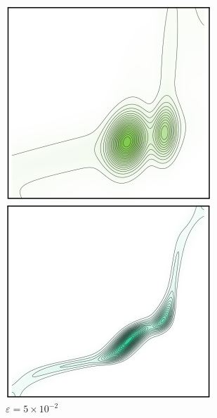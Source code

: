 \documentclass[cn,10pt,math=newtx,citestyle=gb7714-2015,bibstyle=gb7714-2015]{elegantbook}
\begin{document}
\begin{figure}[H]
\begin{minipage}{0.8\linewidth}
\begin{minipage}{0.19\linewidth}
		\caption*{$\varepsilon=10^{-1}$}
	\end{minipage}
	\begin{minipage}{0.19\linewidth}
		\centering
		    \includegraphics[width=\linewidth]{figure/fig4.6/3.png}
		\caption*{$\varepsilon=5\times 10^{-2}$}
	\end{minipage}
	\begin{minipage}{0.19\linewidth}
		\centering
		    \includegraphics[width=\linewidth]{figure/fig4.6/4.png}

\end{minipage}
\end{minipage}
\end{figure}
\end{document}
